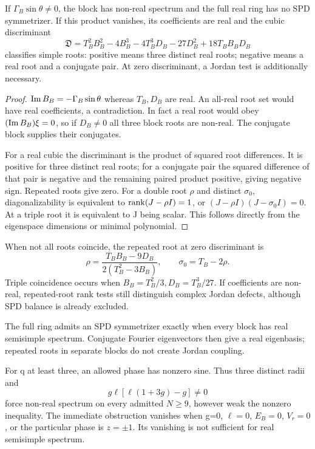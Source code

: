 \begin{theorem}\label{thm:blocks}
If \(\Gamma_B\sin\theta\ne0\), the block has non-real spectrum and the full real ring has no SPD symmetrizer. If this product vanishes, its coefficients are real and the cubic discriminant
\begin{equation}
\mathfrak D=T_B^2B_B^2-4B_B^3-4T_B^3D_B-27D_B^2+18T_BB_BD_B\label{eq:cubicD}
\end{equation}
classifies simple roots: positive means three distinct real roots; negative means a real root and a conjugate pair. At zero discriminant, a Jordan test is additionally necessary.
\end{theorem}
\begin{proof}
\(\operatorname{Im} B_B=-\Gamma_B\sin\theta\) whereas \(T_B,D_B\) are real. An all-real root set would have real coefficients, a contradiction. In fact a real root would obey \((\operatorname{Im} B_B)\xi=0\), so if \(D_B\ne0\) all three block roots are non-real. The conjugate block supplies their conjugates.

For a real cubic the discriminant is the product of squared root differences. It is positive for three distinct real roots; for a conjugate pair the squared difference of that pair is negative and the remaining paired product positive, giving negative sign. Repeated roots give zero. For a double root \(\rho\) and distinct \(\sigma_0\), diagonalizability is equivalent to \(\operatorname{rank}(J-\rho I)=1\), or \((J-\rho I)(J-\sigma_0I)=0\). At a triple root it is equivalent to J being scalar. This follows directly from the eigenspace dimensions or minimal polynomial.
\end{proof}
When not all roots coincide, the repeated root at zero discriminant is
\[
\rho=\frac{T_BB_B-9D_B}{2(T_B^2-3B_B)},\qquad \sigma_0=T_B-2\rho .
\]
Triple coincidence occurs when \(B_B=T_B^2/3,D_B=T_B^3/27\). If coefficients are non-real, repeated-root rank tests still distinguish complex Jordan defects, although SPD balance is already excluded.

The full ring admits an SPD symmetrizer exactly when every block has real semisimple spectrum. Conjugate Fourier eigenvectors then give a real eigenbasis; repeated roots in separate blocks do not create Jordan coupling.

For q at least three, an allowed phase has nonzero sine. Thus three distinct radii and
\begin{equation}
g\ell[\ell(1+3g)-g]\ne0\label{eq:generic}
\end{equation}
force non-real spectrum on every admitted \(N\ge9\), however weak the nonzero inequality. The immediate obstruction vanishes when g=0, \(\ell=0\), \(E_B=0\), \(V_r=0\), or the particular phase is \(z=\pm1\). Its vanishing is not sufficient for real semisimple spectrum.

